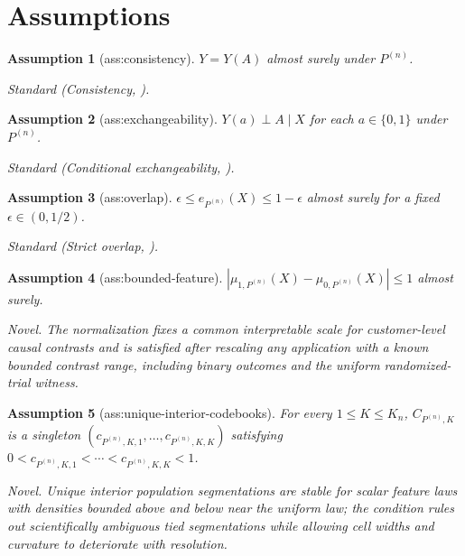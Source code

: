 \documentclass{article}
\newtheorem{assumption}{Assumption}
\begin{document}
\section{Assumptions}

\begin{assumption}[ass:consistency]\label{ass:consistency}
\(Y=Y(A)\) almost surely under \(P^{(n)}\).
\par\smallskip\noindent\emph{Standard} (Consistency, \cite{ChernozhukovEtAl2018DML}).
\end{assumption}

\begin{assumption}[ass:exchangeability]\label{ass:exchangeability}
\(Y(a)\perp A\mid X\) for each \(a\in\{0,1\}\) under \(P^{(n)}\).
\par\smallskip\noindent\emph{Standard} (Conditional exchangeability, \cite{ChernozhukovEtAl2018DML}).
\end{assumption}

\begin{assumption}[ass:overlap]\label{ass:overlap}
\(\epsilon\le e_{P^{(n)}}(X)\le1-\epsilon\) almost surely for a fixed \(\epsilon\in(0,1/2)\).
\par\smallskip\noindent\emph{Standard} (Strict overlap, \cite{ChernozhukovEtAl2018DML}).
\end{assumption}

\begin{assumption}[ass:bounded-feature]\label{ass:bounded-feature}
\(|\mu_{1,P^{(n)}}(X)-\mu_{0,P^{(n)}}(X)|\le1\) almost surely.
\par\smallskip\noindent\emph{Novel.} The normalization fixes a common interpretable scale for customer-level causal contrasts and is satisfied after rescaling any application with a known bounded contrast range, including binary outcomes and the uniform randomized-trial witness.
\end{assumption}

\begin{assumption}[ass:unique-interior-codebooks]\label{ass:unique-interior-codebooks}
For every \(1\le K\le K_n\), \(C_{P^{(n)},K}\) is a singleton \((c_{P^{(n)},K,1},\ldots,c_{P^{(n)},K,K})\) satisfying \(0<c_{P^{(n)},K,1}<\cdots<c_{P^{(n)},K,K}<1\).
\par\smallskip\noindent\emph{Novel.} Unique interior population segmentations are stable for scalar feature laws with densities bounded above and below near the uniform law; the condition rules out scientifically ambiguous tied segmentations while allowing cell widths and curvature to deteriorate with resolution.
\end{assumption}
\end{document}

